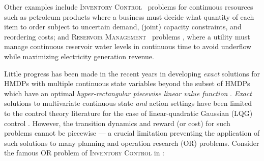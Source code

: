 \documentclass[twoside,11pt]{article}
\newcommand{\InventoryControl}{\textsc{Inventory Control }}
\newcommand{\WaterReservoir}{\textsc{Reservoir Management }}
\begin{document}
Other examples include \InventoryControl\ problems \cite{Scarf_Karlin58} for continuous resources such as petroleum products where a business must decide what quantity of each item to order subject to uncertain demand, (joint) capacity constraints, and reordering costs; and  \WaterReservoir\ problems \cite{reservoir}, where a utility must manage continuous reservoir water levels in continuous time to avoid underflow while maximizing electricity generation revenue.

Little progress has been made in the recent years in developing \emph{exact} solutions for HMDPs with multiple continuous state variables beyond the subset of HMDPs  which have an optimal \emph{hyper-rectangular piecewise linear value function} \cite{feng04,li05}. \emph{Exact} solutions to multivariate continuous state \emph{and} action settings have been limited to the control theory literature for the case of linear-quadratic Gaussian (LQG) control \cite{lqgc}. 
However, the transition dynamics and reward (or cost) for such problems cannot be piecewise --- a crucial limitation preventing the application of such solutions to many planning and operation research (OR) problems. 
Consider the famous OR problem of \InventoryControl in \cite{Scarf_Karlin58}: 
\end{document}
